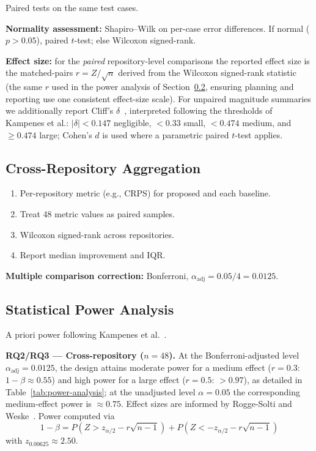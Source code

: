 Paired tests on the same test cases.

\textbf{Normality assessment:} Shapiro–Wilk on per-case error differences.
If normal ($p > 0.05$), paired $t$-test; else Wilcoxon signed-rank.

\textbf{Effect size:} for the \emph{paired} repository-level comparisons the
reported effect size is the matched-pairs $r = Z/\sqrt{n}$ derived from the
Wilcoxon signed-rank statistic (the same $r$ used in the power analysis of
Section~\ref{sec:power-analysis}, ensuring planning and reporting use one consistent
effect-size scale). For unpaired magnitude summaries we additionally report
Cliff's $\delta$~\cite{kampenes2007systematic}, interpreted following the
thresholds of Kampenes et al.: $|\delta| < 0.147$ negligible,
$< 0.33$ small, $< 0.474$ medium, and $\geq 0.474$ large; Cohen's $d$ is used
where a parametric paired $t$-test applies.


\subsection{Cross-Repository Aggregation}
\label{sec:cross-repo-stats}

\begin{enumerate}
    \item Per-repository metric (e.g., CRPS) for proposed and each
    baseline.
    \item Treat 48 metric values as paired samples.
    \item Wilcoxon signed-rank across repositories.
    \item Report median improvement and IQR.
\end{enumerate}

\textbf{Multiple comparison correction:} Bonferroni,
$\alpha_{\text{adj}} = 0.05 / 4 = 0.0125$.


\subsection{Statistical Power Analysis}
\label{sec:power-analysis}

A priori power following
Kampenes et al.~\cite{kampenes2007systematic}.

\textbf{RQ2/RQ3 — Cross-repository ($n=48$).} At the Bonferroni-adjusted
level $\alpha_{\text{adj}} = 0.0125$, the design attains moderate power for a
medium effect ($r = 0.3$: $1-\beta \approx 0.55$) and high power for a large
effect ($r = 0.5$: $> 0.97$), as detailed in
Table~\ref{tab:power-analysis}; at the unadjusted level $\alpha = 0.05$ the
corresponding medium-effect power is $\approx 0.75$. Effect sizes are
informed by Rogge-Solti and
Weske~\cite{RoggeSolti2015NonMarkovianSPN}. Power computed via
\begin{equation}
\label{eq:power}
1 - \beta = P(Z > z_{\alpha/2} - r\sqrt{n-1})
    + P(Z < -z_{\alpha/2} - r\sqrt{n-1})
\end{equation}
with $z_{0.00625} \approx 2.50$.

